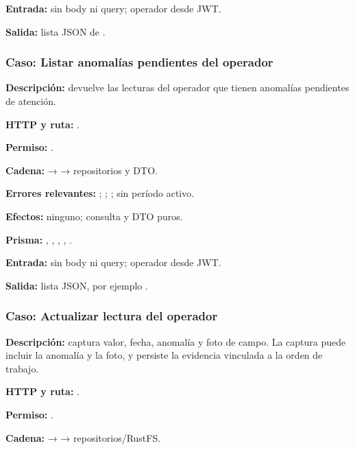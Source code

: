 \textbf{Entrada:} sin body ni query; operador desde JWT.  

\textbf{Salida:} lista JSON de \texttt{}.


\subsubsection{Caso: Listar anomalías pendientes del operador}


\textbf{Descripción:} devuelve las lecturas del operador que tienen anomalías pendientes de atención.  

\textbf{HTTP y ruta:} \texttt{}.  

\textbf{Permiso:} \texttt{}.  

\textbf{Cadena:} \texttt{} → \texttt{} → repositorios y DTO.  

\textbf{Errores relevantes:} \texttt{}; \texttt{}; \texttt{}; \texttt{} sin período activo.  

\textbf{Efectos:} ninguno; consulta y DTO puros.  

\textbf{Prisma:} \texttt{}, \texttt{}, \texttt{}, \texttt{}, \texttt{}.  

\textbf{Entrada:} sin body ni query; operador desde JWT.  

\textbf{Salida:} lista JSON, por ejemplo \texttt{}.


\subsubsection{Caso: Actualizar lectura del operador}


\textbf{Descripción:} captura valor, fecha, anomalía y foto de campo. La captura puede incluir la anomalía y la foto, y persiste la evidencia vinculada a la orden de trabajo.  

\textbf{HTTP y ruta:} \texttt{}.  

\textbf{Permiso:} \texttt{}.  

\textbf{Cadena:} \texttt{} → \texttt{} → repositorios/RustFS.  

